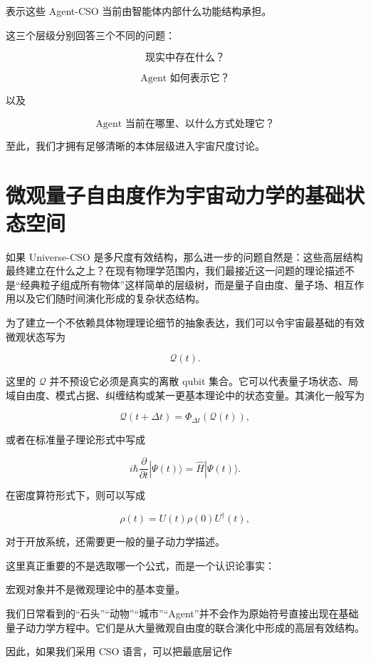 表示这些 Agent-CSO 当前由智能体内部什么功能结构承担。

这三个层级分别回答三个不同的问题：

\[
\text{现实中存在什么？}
\]

\[
\text{Agent 如何表示它？}
\]

以及

\[
\text{Agent 当前在哪里、以什么方式处理它？}
\]

至此，我们才拥有足够清晰的本体层级进入宇宙尺度讨论。

\section{微观量子自由度作为宇宙动力学的基础状态空间}

如果 Universe-CSO 是多尺度有效结构，那么进一步的问题自然是：这些高层结构最终建立在什么之上？在现有物理学范围内，我们最接近这一问题的理论描述不是“经典粒子组成所有物体”这样简单的层级树，而是量子自由度、量子场、相互作用以及它们随时间演化形成的复杂状态结构。

为了建立一个不依赖具体物理理论细节的抽象表达，我们可以令宇宙最基础的有效微观状态写为

\[
\mathcal{Q}(t).
\]

这里的 $\mathcal{Q}$ 并不预设它必须是真实的离散 qubit 集合。它可以代表量子场状态、局域自由度、模式占据、纠缠结构或某一更基本理论中的状态变量。其演化一般写为

\[
\mathcal{Q}(t+\Delta t)
=
\Phi_{\Delta t}
\left(
\mathcal{Q}(t)
\right),
\]

或者在标准量子理论形式中写成

\[
i\hbar
\frac{\partial}{\partial t}
|\Psi(t)\rangle
=
\hat H|\Psi(t)\rangle.
\]

在密度算符形式下，则可以写成

\[
\rho(t)
=
U(t)\rho(0)U^\dagger(t),
\]

对于开放系统，还需要更一般的量子动力学描述。

这里真正重要的不是选取哪一个公式，而是一个认识论事实：

\begin{statementbox}
宏观对象并不是微观理论中的基本变量。
\end{statementbox}

我们日常看到的“石头”“动物”“城市”“Agent”并不会作为原始符号直接出现在基础量子动力学方程中。它们是从大量微观自由度的联合演化中形成的高层有效结构。

因此，如果我们采用 CSO 语言，可以把最底层记作

